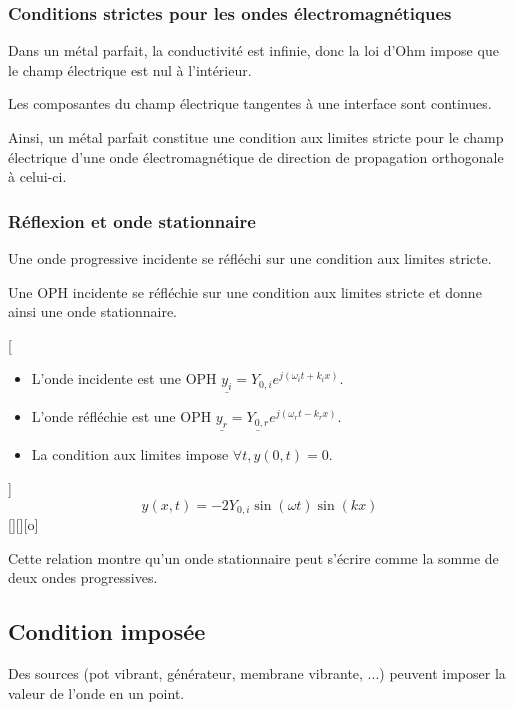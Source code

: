 \subsubsection{Conditions strictes pour les ondes électromagnétiques}
Dans un métal parfait, la conductivité est infinie, donc la loi d'Ohm impose que le champ électrique est nul à l'intérieur.

Les composantes du champ électrique tangentes à une interface sont continues.

Ainsi, un métal parfait constitue une condition aux limites stricte pour le champ électrique d'une onde électromagnétique de direction de propagation orthogonale à celui-ci.

\subsubsection{Réflexion et onde stationnaire}
Une onde progressive incidente se réfléchi sur une condition aux limites stricte.

Une OPH incidente se réfléchie sur une condition aux limites stricte et donne ainsi une onde stationnaire.

[
    \begin{itemize}
        \item L'onde incidente est une OPH $\underline{y_i}=Y_{0,i}e^{j(\omega_it+k_ix)}$.
        \item L'onde réfléchie est une OPH $\underline{y_r}=\underline{Y_{0,r}}e^{j(\omega_rt-k_rx)}$.
        \item La condition aux limites impose $\forall t, y(0,t)=0$.
    \end{itemize}
]
{
    $$y(x,t)=-2Y_{0,i}\sin(\omega t)\sin(kx)$$
}
[][][o]


Cette relation montre qu'un onde stationnaire peut s'écrire comme la somme de deux ondes progressives.

\subsection{Condition imposée}
Des sources (pot vibrant, générateur, membrane vibrante, ...) peuvent imposer la valeur de l'onde en un point.
